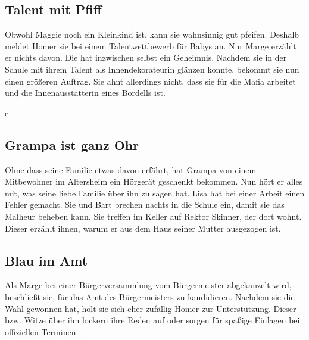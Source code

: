\subsection{Talent mit Pfiff}
Obwohl Maggie noch ein Kleinkind ist, kann sie wahnsinnig gut pfeifen. Deshalb meldet Homer sie bei einem Talentwettbewerb für Babys an. Nur Marge erzählt er nichts davon. Die hat inzwischen selbst ein Geheimnis. Nachdem sie in der Schule mit ihrem Talent als Innendekorateurin glänzen konnte, bekommt sie nun einen größeren Auftrag. Sie ahnt allerdings nicht, dass sie für die Mafia arbeitet und die Innenausstatterin eines Bordells ist.

c

\subsection{Grampa ist ganz Ohr}\label{WABF19}
Ohne dass seine Familie etwas davon erfährt, hat Grampa von einem Mitbewohner im Altersheim ein Hörgerät geschenkt bekommen. Nun hört er alles mit, was seine liebe Familie über ihn zu sagen hat. Lisa hat bei einer Arbeit einen Fehler gemacht. Sie und Bart brechen nachts in die Schule ein, damit sie das Malheur beheben kann. Sie treffen im Keller auf Rektor Skinner, der dort wohnt. Dieser erzählt ihnen, warum er aus dem Haus seiner Mutter ausgezogen ist. 


\subsection{Blau im Amt}
Als Marge bei einer Bürgerversammlung vom Bürgermeister abgekanzelt wird, beschließt sie, für das Amt des Bürgermeisters zu kandidieren. Nachdem sie die Wahl gewonnen hat, holt sie sich eher zufällig Homer zur Unterstützung. Dieser bzw. Witze über ihn lockern ihre Reden auf oder sorgen für spaßige Einlagen bei offiziellen Terminen.

